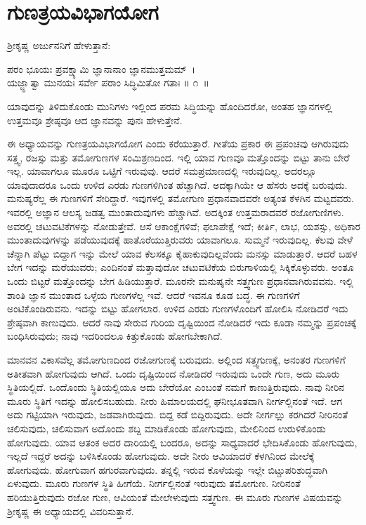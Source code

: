 
\chapter{ಗುಣತ್ರಯವಿಭಾಗಯೋಗ}

ಶ‍್ರೀಕೃಷ್ಣ ಅರ್ಜುನನಿಗೆ ಹೇಳುತ್ತಾನೆ:

\begin{shloka}
ಪರಂ ಭೂಯಃ ಪ್ರವಕ್ಷ್ಯಾಮಿ ಜ್ಞಾನಾನಾಂ ಜ್ಞಾನಮುತ್ತಮಮ್~।\\ಯಜ್ಜ್ಞಾತ್ವಾ ಮುನಯಃ ಸರ್ವೇ ಪರಾಂ ಸಿದ್ಧಿಮಿತೋ ಗತಾಃ \hfill॥ ೧~॥
\end{shloka}

\begin{artha}
ಯಾವುದನ್ನು ತಿಳಿದುಕೊಂಡು ಮುನಿಗಳು ಇಲ್ಲಿಂದ ಪರಮ ಸಿದ್ಧಿಯನ್ನು ಹೊಂದಿದರೋ, ಅಂತಹ ಜ್ಞಾನಗಳಲ್ಲಿ ಉತ್ತಮವೂ ಶ್ರೇಷ್ಠವೂ ಆದ ಜ್ಞಾನವನ್ನು ಪುನಃ ಹೇಳುತ್ತೇನೆ.
\end{artha}

ಈ ಅಧ್ಯಾಯವನ್ನು ಗುಣತ್ರಯವಿಭಾಗಯೋಗ ಎಂದು ಕರೆಯುತ್ತಾರೆ. ಗೀತೆಯ ಪ್ರಕಾರ ಈ ಪ್ರಪಂಚವು ಆಗಿರುವುದು ಸತ್ತ್ವ, ರಜಸ್ಸು ಮತ್ತು ತಮೋಗುಣಗಳ ಸಂಮಿಶ್ರಣದಿಂದ. ಇಲ್ಲಿ ಯಾವ ಗುಣವೂ ಮತ್ತೊಂದನ್ನು ಬಿಟ್ಟು ತಾನು ಬೇರೆ ಇಲ್ಲ. ಯಾವಾಗಲೂ ಮೂರೂ ಒಟ್ಟಿಗೆ ಇರುವುವು. ಆದರೆ ಸಮಪ್ರಮಾಣದಲ್ಲಿ ಇರುವುದಿಲ್ಲ. ಅದರಲ್ಲೂ ಯಾವುದಾದರೂ ಒಂದು ಉಳಿದ ಎರಡು ಗುಣಗಳಿಗಿಂತ ಹೆಚ್ಚಾಗಿದೆ. ಅದಕ್ಕಾಗಿಯೇ ಆ ಹೆಸರು ಅದಕ್ಕೆ ಬರುವುದು. ಮನುಷ್ಯರೆಲ್ಲ ಈ ಗುಣಗಳಿಗೆ ಸೇರಿದ್ದಾರೆ. ಇವುಗಳಲ್ಲಿ ತಮೋಗುಣ ಪ್ರಧಾನವಾದವರೇ ಅತ್ಯಂತ ಕೆಳಗಿನ ಮಟ್ಟದವರು. ಇವರಲ್ಲಿ ಅಜ್ಞಾನ ಆಲಸ್ಯ ಜಡತ್ವ ಮುಂತಾದುವುಗಳು ಹೆಚ್ಚಾಗಿವೆ. ಅದಕ್ಕಿಂತ ಉತ್ತಮರಾದವರೆ ರಜೋಗುಣಿಗಳು. ಅವರಲ್ಲಿ ಚಟುವಟಿಕೆಗಳನ್ನು ನೋಡುತ್ತೇವೆ. ಆಸೆ ಆಕಾಂಕ್ಷೆಗಳಿವೆ; ಫಲಾಪೇಕ್ಷೆ ಇದೆ; ಕೀರ್ತಿ, ಲಾಭ, ಯಶಸ್ಸು, ಅಧಿಕಾರ ಮುಂತಾದುವುಗಳನ್ನು ಪಡೆಯುವುದಕ್ಕೆ ಹಾತೊರೆಯುತ್ತಿರುವರು ಯಾವಾಗಲೂ. ಸುಮ್ಮನೆ ಇರುವುದಿಲ್ಲ. ಕೆಲವು ವೇಳೆ ಚೆನ್ನಾಗಿ ಪೆಟ್ಟು ಬಿದ್ದಾಗ ಇನ್ನು ಮೇಲೆ ಯಾವ ಕೆಲಸಕ್ಕೂ ಕೈಹಾಕುವುದಿಲ್ಲವೆಂದು ಮನಸ್ಸು ಮಾಡುತ್ತಾರೆ. ಆದರೆ ಬಹಳ ಬೇಗ ಇದನ್ನು ಮರೆಯುವರು; ಎಂದಿನಂತೆ ಮತ್ತಾವುದೋ ಚಟುವಟಿಕೆಯ ಬಿರುಗಾಳಿಯಲ್ಲಿ ಸಿಕ್ಕಿಕೊಳ್ಳುವರು. ಅಂತೂ ಒಂದು ಬಿಟ್ಟರೆ ಮತ್ತೊಂದನ್ನು ಬೇಗ ಹಿಡಿಯುತ್ತಾರೆ. ಮೂರನೇ ಮನುಷೃನೇ ಸತ್ತ್ವಗುಣ ಪ್ರಧಾನವಾಗಿರುವವನು. ಇಲ್ಲಿ ಶಾಂತಿ ಜ್ಞಾನ ಮುಂತಾದ ಒಳ್ಳೆಯ ಗುಣಗಳೆಲ್ಲ ಇವೆ. ಆದರೆ ಇವನೂ ಕೂಡ ಬದ್ಧ. ಈ ಗುಣಗಳಿಗೆ ಅಂಟಿಕೊಂಡಿರುವನು. ಇದನ್ನು ಬಿಟ್ಟು ಹೋಗಲಾರ. ಉಳಿದ ಎರಡು ಗುಣಗಳೊಂದಿಗೆ ಹೋಲಿಸಿ ನೋಡಿದರೆ ಇದು ಶ್ರೇಷ್ಠವಾಗಿ ಕಾಣುವುದು. ಆದರೆ ನಾವು ಸೇರುವ ಗುರಿಯ ದೃಷ್ಟಿಯಿಂದ ನೋಡಿದರೆ ಇದು ಕೂಡಾ ನಮ್ಮನ್ನು ಪ್ರಪಂಚಕ್ಕೆ ಬಂಧಿಸಿರುವುದು; ನಾವು ಇದರಿಂದಲೂ ಕಿತ್ತುಕೊಂಡು ಹೋಗಬೇಕಾಗಿದೆ.

ಮಾನವನ ವಿಕಾಸವೆಲ್ಲ ತಮೋಗುಣದಿಂದ ರಜೋಗುಣಕ್ಕೆ ಬರುವುದು. ಅಲ್ಲಿಂದ ಸತ್ತ್ವ\-ಗುಣಕ್ಕೆ, ಅನಂತರ ಗುಣಗಳಿಗೆ ಅತೀತವಾಗಿ ಹೋಗುವುದು ಆಗಿದೆ. ಒಂದು ದೃಷ್ಟಿಯಿಂದ ನೋಡಿದರೆ ಇರುವುದು ಒಂದೇ ಗುಣ, ಅದು ಮೂರು ಸ್ಥಿತಿಯಲ್ಲಿದೆ. ಒಂದೊಂದು ಸ್ಥಿತಿ\-ಯಲ್ಲಿಯೂ ಅದು ಬೇರೆಯೋ ಎಂಬಂತೆ ನಮಗೆ ಕಾಣುತ್ತಿರುವುದು. ನಾವು ನೀರಿನ ಮೂರು ಸ್ಥಿತಿಗೆ ಇದನ್ನು ಹೋಲಿಸಬಹುದು. ನೀರು ಹಿಮಾಲಯದಲ್ಲಿ ಘನೀಭೂತವಾಗಿ ನೀರ್ಗಲ್ಲಿನಂತೆ ಇದೆ. ಆಗ ಅದು ಗಟ್ಟಿಯಾಗಿ ಇರುವುದು, ಜಡವಾಗಿರುವುದು. ಬಿದ್ದ ಕಡೆ ಬಿದ್ದಿರುವುದು. ಅದೇ ನೀರ್ಗಲ್ಲು ಕರಗಿದರೆ ನೀರಿನಂತೆ ಚಲಿಸುವುದು, ಚಲಿಸುವಾಗ ಅದೊಂದು ಶಬ್ದ ಮಾಡಿಕೊಂಡು ಹೋಗುವುದು, ಮೇಲಿನಿಂದ ಉರುಳಿಕೊಂಡು ಹೋಗುವುದು. ಯಾವ ಆತಂಕ ಅದರ ದಾರಿಯಲ್ಲಿ ಬಂದರೂ, ಅದನ್ನು ಸಾಧ್ಯವಾದರೆ ಭೇದಿಸಿಕೊಂಡು ಹೋಗುವುದು, ಇಲ್ಲದೆ ಇದ್ದರೆ ಅದನ್ನು ಬಳಿಸಿಕೊಂಡು ಹೋಗುವುದು. ಅದೇ ನೀರು ಆವಿಯಾದರೆ ಕೆಳಗಿನಿಂದ ಮೇಲೆಕ್ಕೆ ಹೋಗುವುದು. ಹೋಗುವಾಗ ಹಗುರವಾಗುವುದು. ತನ್ನಲ್ಲಿ ಇರುವ ಕೊಳೆಯನ್ನು ಇಲ್ಲೇ ಬಿಟ್ಚುಪರಿಶುದ್ಧವಾಗಿ ಏಳುವುದು. ಮೂರು ಗುಣಗಳ ಸ್ಥಿತಿ ಹೀಗೆಯೆ. ನೀರ್ಗಲ್ಲಿನಂತೆ ಇರುವುದು ತಮೋಗುಣ. ನೀರಿನಂತೆ ಹರಿಯುತ್ತಿರುವುದು ರಜೋ ಗುಣ, ಆವಿಯಂತೆ ಮೇಲೇಳುವುದು ಸತ್ತ್ವಗುಣ. ಈ ಮೂರು ಗುಣಗಳ ವಿಷಯವನ್ನು ಶ‍್ರೀಕೃಷ್ಣ ಈ ಅಧ್ಯಾಯದಲ್ಲಿ ವಿವರಿಸುತ್ತಾನೆ.

